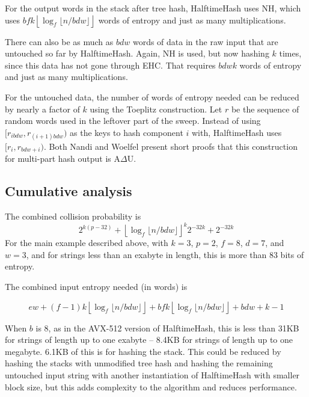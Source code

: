 \documentclass[sigconf, nonacm]{acmart}
\begin{document}
For the output words in the stack after tree hash, HalftimeHash uses NH, which uses $b f k \left\lfloor \log_f \lfloor n / b d w \rfloor \right\rfloor$ words of entropy and just as many multiplications.

There can also be as much as $b d w$ words of data in the raw input that are untouched so far by HalftimeHash.
Again, NH is used, but now hashing $k$ times, since this data has not gone through EHC.
That requires $b d w k$ words of entropy and just as many multiplications.

For the untouched data, the number of words of entropy needed can be reduced by nearly a factor of $k$ using the Toeplitz construction.
Let $r$ be the sequence of random words used in the leftover part of the sweep.
Instead of using $[r_{i b d w}, r_{(i+1)b d w})$ as the keys to hash component $i$ with, HalftimeHash uses $[r_{i}, r_{b d w + i})$.
Both Nandi and Woelfel present short proofs that this construction for multi-part hash output is A$\Delta$U. \cite{ehc-nandi,woelfel-toeplitz}


\subsection{Cumulative analysis}

The combined collision probability is
\[2^{k(p-32)} + \left\lfloor \log_f \lfloor n / b d w \rfloor \right\rfloor^k 2^{-32k} + 2^{-32k}\]
For the main example described above, with $k=3$, $p=2$, $f=8$, $d = 7$, and $w=3$, and for strings less than an exabyte in length, this is more than 83 bits of entropy.

The combined input entropy needed (in words) is

\[
e w
+ (f-1) k \left\lfloor\log_f \lfloor n/b d w\rfloor\right\rfloor
+ b f k \left\lfloor\log_f \lfloor n/b d w\rfloor\right\rfloor
+ b d w + k - 1
\]

When $b$ is 8, as in the AVX-512 version of HalftimeHash, this is less than 31KB for strings of length up to one exabyte -- 8.4KB for strings of length up to one megabyte.
6.1KB of this is for hashing the stack.
This could be reduced by hashing the stacks with unmodified tree hash and hashing the remaining untouched input string with another instantiation of HalftimeHash with smaller block size, but this adds complexity to the algorithm and reduces performance.
\end{document}
